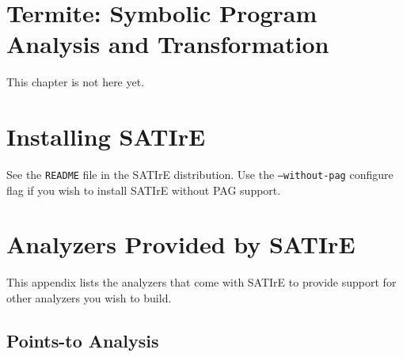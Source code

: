 \documentclass[a4paper,12pt]{report}
\begin{document}
\chapter{Termite: Symbolic Program Analysis and Transformation}
\label{chap:termite}

This chapter is not here yet.

\appendix

\chapter{Installing SATIrE}
\label{appendix:installing}

See the \texttt{README} file in the SATIrE distribution. Use the
\texttt{--without-pag} configure flag if you wish to install SATIrE without
PAG support.

\chapter{Analyzers Provided by SATIrE}
\label{appendix:analyzers}

This appendix lists the analyzers that come with SATIrE to provide support
for other analyzers you wish to build.

\section{Points-to Analysis}
\label{sec:analysis_pointsto}
\end{document}
